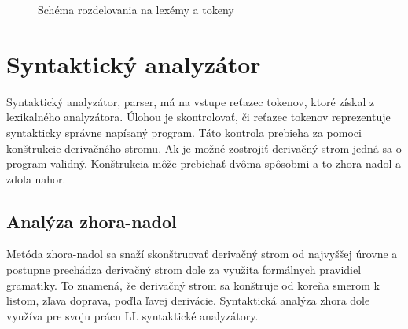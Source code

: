 \begin{center}
\begin{figure}[h]
\caption{Schéma rozdelovania na lexémy a tokeny}
\label{fig:lex}

\end{figure}
\end{center}


\section{Syntaktický analyzátor}
Syntaktický analyzátor, parser, má na vstupe reťazec tokenov, ktoré získal
z lexikalného analyzátora. Úlohou je skontrolovať, či
reťazec tokenov reprezentuje syntakticky správne napísaný program. Táto kontrola
prebieha za pomoci konštrukcie derivačného stromu. Ak je možné zostrojiť derivačný strom
jedná sa o program validný. Konštrukcia môže prebiehať dvôma spôsobmi a to zhora
nadol a zdola nahor. \cite{meduna} 

\subsection{Analýza zhora-nadol}
Metóda zhora-nadol sa snaží skonštruovať derivačný strom od najvyššej úrovne a postupne prechádza derivačný strom dole za využita formálnych pravidiel gramatiky. To znamená, že derivačný strom sa konštruje od koreňa smerom k listom, zľava doprava, poďla ľavej derivácie. Syntaktická analýza zhora dole využíva pre svoju prácu LL syntaktické analyzátory. \cite{aho}

